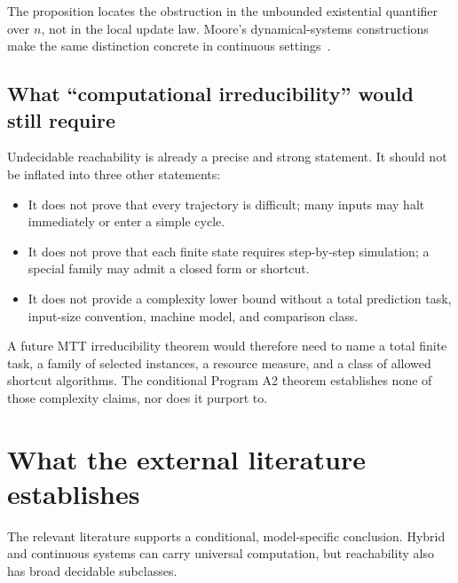 \documentclass[11pt]{article}
\theoremstyle{definition}
\theoremstyle{remark}
\begin{document}
The proposition locates the obstruction in the unbounded existential
quantifier over \(n\), not in the local update law.  Moore's dynamical-systems
constructions make the same distinction concrete in continuous
settings~\cite{Moore1990,Moore1991}.

\subsection{What ``computational irreducibility'' would still require}

Undecidable reachability is already a precise and strong statement.  It should
not be inflated into three other statements:
\begin{itemize}
\item It does not prove that every trajectory is difficult; many inputs may
halt immediately or enter a simple cycle.
\item It does not prove that each finite state requires step-by-step
simulation; a special family may admit a closed form or shortcut.
\item It does not provide a complexity lower bound without a total prediction
task, input-size convention, machine model, and comparison class.
\end{itemize}

A future MTT irreducibility theorem would therefore need to name a total
finite task, a family of selected instances, a resource measure, and a class of
allowed shortcut algorithms.  The conditional Program A2 theorem establishes
none of those complexity claims, nor does it purport to.

\section{What the external literature establishes}

The relevant literature supports a conditional, model-specific conclusion.
Hybrid and continuous systems can carry universal computation, but reachability
also has broad decidable subclasses.
\end{document}
